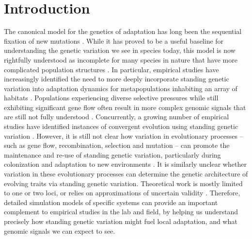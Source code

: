 \documentclass{article}
\begin{document}
\section*{Introduction}

The canonical model for the genetics of adaptation has long been the sequential fixation of new mutations 
\citep{smith_haigh_1974, Endler_1977, Orr_2005}.
While it has proved to be a useful baseline for understanding the genetic variation we see in species today, this model is now rightfully understood as incomplete for many species in nature that have more complicated population structures 
\citep{Lai2152, Schrider2017}. 
In particular, empirical studies have increasingly identified the need to more deeply incorporate standing genetic variation into adaptation dynamics for metapopulations inhabiting an array of habitats 
\citep{Hermisson_2008, Barrett2008}. Populations experiencing diverse selective pressures while still exhibiting significant gene flow often result in more complex genomic signals that are still not fully understood 
\citep{Charlesworth_1997, Charlesworth_2003, Nosil_2009, Flaxman_2013, Samuk_2017}. 
Concurrently, a growing number of empirical studies have identified instances of convergent evolution using standing genetic variation 
\citep{jones_genomic_2012, roesti_genome_2012, feulner_genomics_2015, Schrider2017, Barrett2008, Nelson_2018, Nelson_2019, Bassham_2018}.  However, it is still not clear how variation in evolutionary processes -- such as gene flow, recombination, selection and mutation --  can promote the maintenance and re-use of standing genetic variation, particularly during colonization and adaptation to new environments
\citep{Nelson_2018, Pritchard_2010, yeaman2011genetic, Schrider2017}. 
It is similarly unclear whether variation in these evolutionary processes can determine the genetic architecture of evolving traits via standing genetic variation. 
Theoretical work is mostly limited to one or two loci, or relies on approximations of uncertain validity
\citep[e.g.,][]{slatkin1975selection,petry1983effect,barton1986barrier,yeaman2011genetic,ralph2015standing}.
Therefore, detailed simulation models of specific systems can 
provide an important complement to empirical studies in the lab and field,
by helping us understand precisely how standing genetic variation might fuel local adaptation,
and what genomic signals we can expect to see.
\end{document}
